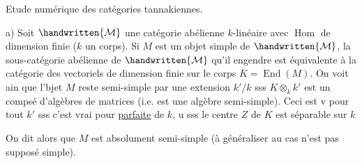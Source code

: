 Etude numérique des catégories tannakiennes.

a) Soit $\handwritten{\mathcal{M}}$ une catégorie abélienne $k$-linéaire avec $\operatorname{Hom}$ de dimension finie ($k$ un corps). Si $M$ est un objet simple de $\handwritten{\mathcal{M}}$, la sous-catégorie abélienne de $\handwritten{\mathcal{M}}$ qu'il engendre est équivalente à la catégorie des vectoriels de dimension finie sur le corps $K=\operatorname{End}(M)$. On voit ain que l'bjet $M$ reste semi-simple par une extension $k'/k$ sss $K\otimes_k k'$ est un compsé  d'algèbres de matrices (i.e. est une algèbre semi-simple). Ceci est v pour tout $k'$ sss c'est vrai pour  \uline{parfaite} de $k$, u sss le centre  $Z$ de $K$ est séparable sur $k$ On dit alors que $M$ est absolument semi-simple (à généraliser au cas n'est pas supposé simple).

